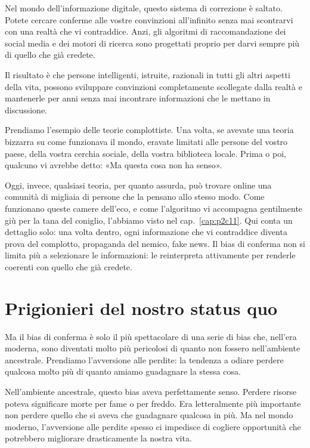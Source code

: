 Nel mondo dell'informazione digitale, questo sistema di correzione è saltato. Potete cercare conferme alle vostre convinzioni all'infinito senza mai scontrarvi con una realtà che vi contraddice. Anzi, gli algoritmi di raccomandazione dei social media e dei motori di ricerca sono progettati proprio per darvi sempre più di quello che già credete.

Il risultato è che persone intelligenti, istruite, razionali in tutti gli altri aspetti della vita, possono sviluppare convinzioni completamente scollegate dalla realtà e mantenerle per anni senza mai incontrare informazioni che le mettano in discussione.

\medskip

Prendiamo l'esempio delle teorie complottiste. Una volta, se avevate una teoria bizzarra su come funzionava il mondo, eravate limitati alle persone del vostro paese, della vostra cerchia sociale, della vostra biblioteca locale. Prima o poi, qualcuno vi avrebbe detto: «Ma questa cosa non ha senso».

Oggi, invece, qualsiasi teoria, per quanto assurda, può trovare online una comunità di migliaia di persone che la pensano allo stesso modo. Come funzionano queste camere dell'eco, e come l'algoritmo vi accompagna gentilmente giù per la tana del coniglio, l'abbiamo visto nel cap.~\ref{cap:p2c11}. Qui conta un dettaglio solo: una volta dentro, ogni informazione che vi contraddice diventa prova del complotto, propaganda del nemico, fake news. Il bias di conferma non si limita più a selezionare le informazioni: le reinterpreta attivamente per renderle coerenti con quello che già credete.

\bigskip

\section{Prigionieri del nostro status quo}
\label{sec:p4c8-prigionieri-del-nostro}
Ma il bias di conferma è solo il più spettacolare di una serie di bias che, nell'era moderna, sono diventati molto più pericolosi di quanto non fossero nell'ambiente ancestrale. Prendiamo l'avversione alle perdite: la tendenza a odiare perdere qualcosa molto più di quanto amiamo guadagnare la stessa cosa.

Nell'ambiente ancestrale, questo bias aveva perfettamente senso. Perdere risorse poteva significare morte per fame o per freddo. Era letteralmente più importante non perdere quello che si aveva che guadagnare qualcosa in più. Ma nel mondo moderno, l'avversione alle perdite spesso ci impedisce di cogliere opportunità che potrebbero migliorare drasticamente la nostra vita.


